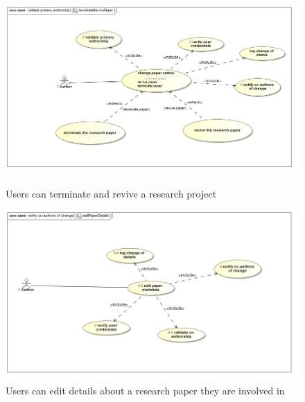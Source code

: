 \documentclass[a4paper,12pt]{report}
\begin{document}
\begin{figure}[ht]
\includegraphics[scale=0.5]{uc__validate_primary_authorship__terminateRevivePaper.jpg} 
\caption{Users can terminate and revive a research project}


\includegraphics[scale=0.5]{uc__notify_co-authors_of_change__editPaperDetails.jpg} 
\caption{Users can edit details about a research paper they are involved in}

\end{figure}
\newpage
\end{document}
